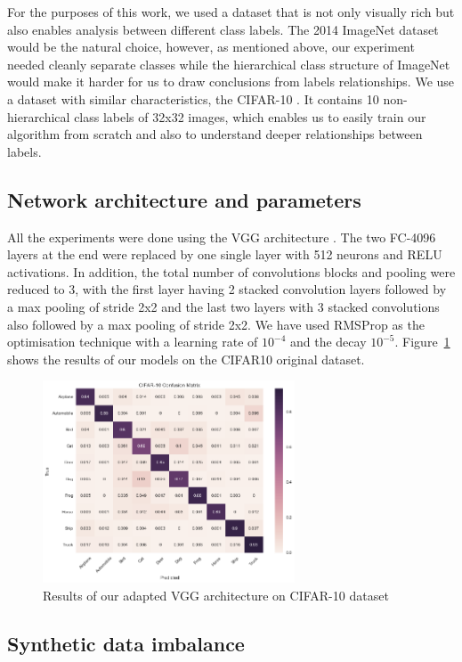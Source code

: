 \documentclass[runningheads,a4paper]{llncs}
\begin{document}
For the purposes of this work, we used a dataset that is not only visually rich but also enables analysis between different class labels. The 2014 ImageNet dataset \cite{deng2009imagenet} would be the natural choice, however, as mentioned above, our experiment needed cleanly separate classes while the hierarchical class structure of ImageNet would make it harder for us to draw conclusions from labels relationships. We use a dataset with similar characteristics, the CIFAR-10 \cite{krizhevsky_2009}. It contains 10 non-hierarchical class labels of 32x32 images, which enables us to easily train our algorithm from scratch and also to understand deeper relationships between labels.
\subsection{Network architecture and parameters}

All the experiments were done using the VGG architecture \cite{simonyan2014very}. The two FC-4096 layers at the end were replaced by one single layer with 512 neurons and RELU activations. In addition, the total number of convolutions blocks and pooling were reduced to 3, with the first layer having 2 stacked convolution layers followed by a max pooling of stride 2x2 and the last two layers with 3 stacked convolutions also followed by a max pooling of stride 2x2. We have used RMSProp  \cite{bengiormsprop} as the optimisation technique with a learning rate of $10^{-4}$ and the decay $10^{-5}$. Figure~\ref{fig:conf_matrix_full} shows the results of our models on the CIFAR10 original dataset.

\begin{figure}
	\centering
	\includegraphics[height=6.0cm]{conf_matrix.png}
	\caption{Results of our adapted VGG architecture on CIFAR-10 dataset}
	\label{fig:conf_matrix_full}
\end{figure}

\subsection{Synthetic data imbalance}
\end{document}
